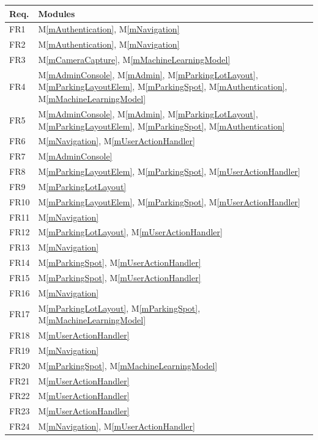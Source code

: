 \documentclass[12pt, titlepage]{article}
\newcommand{\mref}[1]{M\ref{#1}}
\begin{document}
\begin{table}[H]
\centering
\begin{tabular}{p{} p{}}
\toprule
\textbf{Req.} & \textbf{Modules}\\
\midrule
FR1 & \mref{mAuthentication}, \mref{mNavigation}\\
FR2 & \mref{mAuthentication}, \mref{mNavigation}\\
FR3 & \mref{mCameraCapture}, \mref{mMachineLearningModel}\\
FR4 & \mref{mAdminConsole}, \mref{mAdmin}, \mref{mParkingLotLayout},
\mref{mParkingLayoutElem}, \mref{mParkingSpot}, \mref{mAuthentication},
\mref{mMachineLearningModel}\\
FR5 & \mref{mAdminConsole}, \mref{mAdmin}, \mref{mParkingLotLayout},
\mref{mParkingLayoutElem}, \mref{mParkingSpot}, \mref{mAuthentication}\\
FR6 & \mref{mNavigation}, \mref{mUserActionHandler}\\
FR7 & \mref{mAdminConsole}\\
FR8 & \mref{mParkingLayoutElem}, \mref{mParkingSpot},
\mref{mUserActionHandler}\\
FR9 & \mref{mParkingLotLayout}\\
FR10 & \mref{mParkingLayoutElem}, \mref{mParkingSpot},
\mref{mUserActionHandler}\\
FR11 & \mref{mNavigation}\\
FR12 & \mref{mParkingLotLayout}, \mref{mUserActionHandler}\\
FR13 & \mref{mNavigation}\\
FR14 & \mref{mParkingSpot}, \mref{mUserActionHandler}\\
FR15 & \mref{mParkingSpot}, \mref{mUserActionHandler}\\
FR16 & \mref{mNavigation}\\
FR17 & \mref{mParkingLotLayout}, \mref{mParkingSpot},
\mref{mMachineLearningModel}\\
FR18 & \mref{mUserActionHandler}\\
FR19 & \mref{mNavigation}\\
FR20 & \mref{mParkingSpot}, \mref{mMachineLearningModel}\\
FR21 & \mref{mUserActionHandler}\\
FR22 & \mref{mUserActionHandler}\\
FR23 & \mref{mUserActionHandler}\\
FR24 & \mref{mNavigation}, \mref{mUserActionHandler}\\

\end{tabular}
\end{table}
\end{document}
